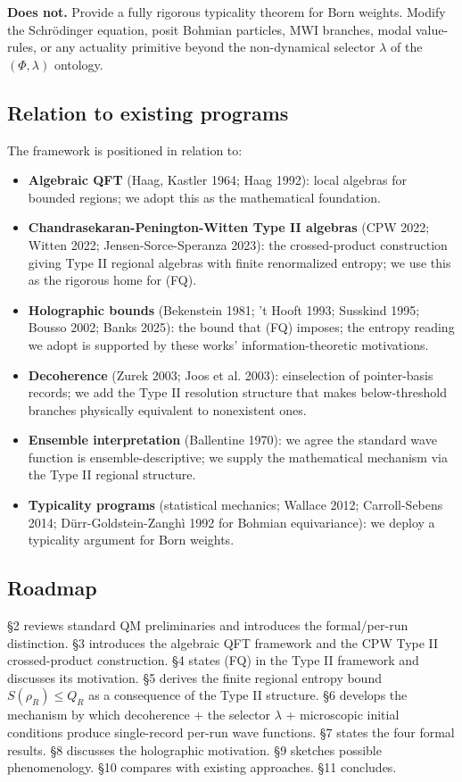 \documentclass[11pt,a4paper]{article}
\begin{document}
\textbf{Does not.} Provide a fully rigorous typicality theorem for Born weights. Modify the Schrödinger equation, posit Bohmian particles, MWI branches, modal value-rules, or any actuality primitive beyond the non-dynamical selector $\lambda$ of the $(\Phi,\lambda)$ ontology.

\subsection{Relation to existing programs}

The framework is positioned in relation to:

\begin{itemize}
  \item \textbf{Algebraic QFT} (Haag, Kastler 1964; Haag 1992): local algebras for bounded regions; we adopt this as the mathematical foundation.
  \item \textbf{Chandrasekaran-Penington-Witten Type II algebras} (CPW 2022; Witten 2022; Jensen-Sorce-Speranza 2023): the crossed-product construction giving Type II regional algebras with finite renormalized entropy; we use this as the rigorous home for (FQ).
  \item \textbf{Holographic bounds} (Bekenstein 1981; 't Hooft 1993; Susskind 1995; Bousso 2002; Banks 2025): the bound that (FQ) imposes; the entropy reading we adopt is supported by these works' information-theoretic motivations.
  \item \textbf{Decoherence} (Zurek 2003; Joos et al. 2003): einselection of pointer-basis records; we add the Type II resolution structure that makes below-threshold branches physically equivalent to nonexistent ones.
  \item \textbf{Ensemble interpretation} (Ballentine 1970): we agree the standard wave function is ensemble-descriptive; we supply the mathematical mechanism via the Type II regional structure.
  \item \textbf{Typicality programs} (statistical mechanics; Wallace 2012; Carroll-Sebens 2014; Dürr-Goldstein-Zanghì 1992 for Bohmian equivariance): we deploy a typicality argument for Born weights.
\end{itemize}

\subsection{Roadmap}

§2 reviews standard QM preliminaries and introduces the formal/per-run distinction. §3 introduces the algebraic QFT framework and the CPW Type II crossed-product construction. §4 states (FQ) in the Type II framework and discusses its motivation. §5 derives the finite regional entropy bound $S(\rho_R) \le Q_R$ as a consequence of the Type II structure. §6 develops the mechanism by which decoherence + the selector $\lambda$ + microscopic initial conditions produce single-record per-run wave functions. §7 states the four formal results. §8 discusses the holographic motivation. §9 sketches possible phenomenology. §10 compares with existing approaches. §11 concludes.
\end{document}
